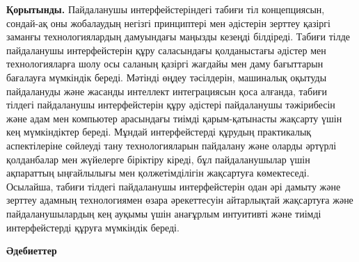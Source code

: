 {\bfseries Қорытынды.} Пайдаланушы интерфейстеріндегі табиғи тіл
концепциясын, сондай-ақ оны жобалаудың негізгі принциптері мен әдістерін
зерттеу қазіргі заманғы технологиялардың дамуындағы маңызды кезеңді
білдіреді. Табиғи тілде пайдаланушы интерфейстерін құру саласындағы
қолданыстағы әдістер мен технологияларға шолу осы саланың қазіргі
жағдайы мен даму бағыттарын бағалауға мүмкіндік береді. Мәтінді өңдеу
тәсілдерін, машиналық оқытуды пайдалануды және жасанды интеллект
интеграциясын қоса алғанда, табиғи тілдегі пайдаланушы интерфейстерін
құру әдістері пайдаланушы тәжірибесін және адам мен компьютер арасындағы
тиімді қарым-қатынасты жақсарту үшін кең мүмкіндіктер береді. Мұндай
интерфейстерді құрудың практикалық аспектілеріне сөйлеуді тану
технологияларын пайдалану және оларды әртүрлі қолданбалар мен жүйелерге
біріктіру кіреді, бұл пайдаланушылар үшін ақпараттың ыңғайлылығы мен
қолжетімділігін жақсартуға көмектеседі. Осылайша, табиғи тілдегі
пайдаланушы интерфейстерін одан әрі дамыту және зерттеу адамның
технологиямен өзара әрекеттесуін айтарлықтай жақсартуға және
пайдаланушылардың кең ауқымы үшін анағұрлым интуитивті және тиімді
интерфейстерді құруға мүмкіндік береді.

{\bfseries Әдебиеттер}

